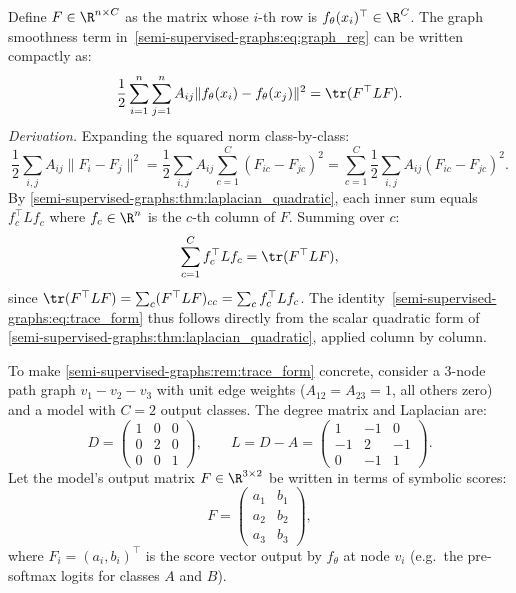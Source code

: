 \begin{notechapter}
\begin{remark}
\label{semi-supervised-graphs:rem:trace_form}
Define $F \in \R^{n \times C}$ as the matrix whose $i$-th row is
$f_\theta(x_i)^\top \in \R^C$. The graph smoothness term in~\eqref{semi-supervised-graphs:eq:graph_reg}
can be written compactly as:
\begin{equation}
\label{semi-supervised-graphs:eq:trace_form}
\frac{1}{2}\sum_{i=1}^n\sum_{j=1}^n A_{ij}\|f_\theta(x_i) - f_\theta(x_j)\|^2
= \tr(F^\top L F).
\end{equation}
\emph{Derivation.} Expanding the squared norm class-by-class:
\[
\frac{1}{2}\sum_{i,j}A_{ij}\|F_i - F_j\|^2
= \frac{1}{2}\sum_{i,j}A_{ij}\sum_{c=1}^C(F_{ic}-F_{jc})^2
= \sum_{c=1}^C \frac{1}{2}\sum_{i,j}A_{ij}(F_{ic}-F_{jc})^2.
\]
By \cref{semi-supervised-graphs:thm:laplacian_quadratic}, each inner sum equals $f_c^\top L f_c$
where $f_c \in \R^n$ is the $c$-th column of $F$. Summing over $c$:
\[
\sum_{c=1}^C f_c^\top L f_c = \tr(F^\top L F),
\]
since $\tr(F^\top L F) = \sum_c (F^\top L F)_{cc} = \sum_c f_c^\top L f_c$. The
identity~\eqref{semi-supervised-graphs:eq:trace_form} thus follows directly from the scalar quadratic
form of \cref{semi-supervised-graphs:thm:laplacian_quadratic}, applied column by column.
\end{remark}

\begin{example}
\label{semi-supervised-graphs:ex:trace_form_symbolic}
To make \cref{semi-supervised-graphs:rem:trace_form} concrete, consider a 3-node path graph
$v_1 - v_2 - v_3$ with unit edge weights ($A_{12} = A_{23} = 1$, all others
zero) and a model with $C = 2$ output classes. The degree matrix and Laplacian
are:
\[
D = \begin{pmatrix} 1 & 0 & 0 \\ 0 & 2 & 0 \\ 0 & 0 & 1 \end{pmatrix}, \qquad
L = D - A = \begin{pmatrix} 1 & -1 & 0 \\ -1 & 2 & -1 \\ 0 & -1 & 1 \end{pmatrix}.
\]
Let the model's output matrix $F \in \R^{3 \times 2}$ be written in terms of
symbolic scores:
\[
F = \begin{pmatrix} a_1 & b_1 \\ a_2 & b_2 \\ a_3 & b_3 \end{pmatrix},
\]
where $F_i = (a_i, b_i)^\top$ is the score vector output by $f_\theta$ at node
$v_i$ (e.g.\ the pre-softmax logits for classes $A$ and $B$).


\end{example}
\end{notechapter}

